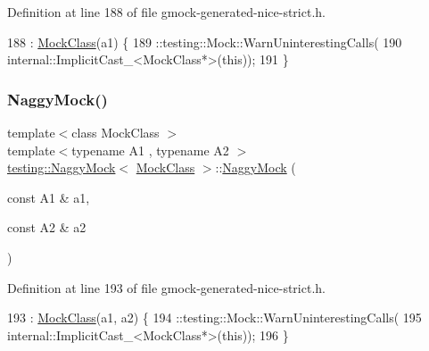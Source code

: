 Definition at line 188 of file gmock-\/generated-\/nice-\/strict.\+h.


\begin{DoxyCode}
188                                    : \hyperlink{classMockClass}{MockClass}(a1) \{
189     ::testing::Mock::WarnUninterestingCalls(
190         internal::ImplicitCast\_<MockClass*>(\textcolor{keyword}{this}));
191   \}
\end{DoxyCode}
\mbox{\label{classtesting_1_1NaggyMock_a4241363ab2ca3a2e7baa5ead980175e6}} 
\subsubsection{\texorpdfstring{Naggy\+Mock()}{NaggyMock()}\hspace{0.1cm}{\footnotesize\ttfamily [3/11]}}
{\footnotesize\ttfamily template$<$class Mock\+Class $>$ \\
template$<$typename A1 , typename A2 $>$ \\
\hyperlink{classtesting_1_1NaggyMock}{testing\+::\+Naggy\+Mock}$<$ \hyperlink{classMockClass}{Mock\+Class} $>$\+::\hyperlink{classtesting_1_1NaggyMock}{Naggy\+Mock} (\begin{DoxyParamCaption}\item[{const A1 \&}]{a1,  }\item[{const A2 \&}]{a2 }\end{DoxyParamCaption})\hspace{0.3cm}{\ttfamily [inline]}}



Definition at line 193 of file gmock-\/generated-\/nice-\/strict.\+h.


\begin{DoxyCode}
193                                         : \hyperlink{classMockClass}{MockClass}(a1, a2) \{
194     ::testing::Mock::WarnUninterestingCalls(
195         internal::ImplicitCast\_<MockClass*>(\textcolor{keyword}{this}));
196   \}
\end{DoxyCode}
\mbox{\label{classtesting_1_1NaggyMock_abd9eea0573bf39f4b41504b2d1df5311}} 
